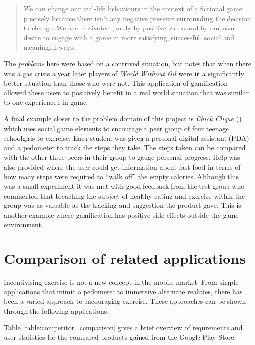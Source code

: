 \begin{quote}
  We can change our real-life
  behaviours in the context of a fictional game precisely because there
  isn't any negative pressure surrounding the decision to change. We
  are motivated purely by positive stress and by our own desire to
  engage with a game in more satisfying, successful, social and
  meaningful ways.
\end{quote}

The \emph{problems} here were based on a contrived situation, but
\citeauthor{reality_broken} notes that when there was a gas crisis a
year later players of \emph{World Without Oil} were in a significantly
better situation than those who were not. This application of
gamification allowed these users to positively benefit in a real world
situation that was similar to one experienced in game.

A final example closer to the problem domain of this project is
\emph{Chick Clique} (\citet{chick}) which uses social game elements to
encourage a peer group of four teenage schoolgirls to exercise. Each
student was given a personal digital assistant (PDA) and a pedometer
to track the steps they take. The steps taken can be compared with the
other three peers in their group to gauge personal progress. Help was
also provided where the user could get information about fast-food in
terms of how many steps were required to ``walk off'' the empty
calories. Although this was a small experiment it was met with good
feedback from the test group who commented that breaching the subject
of healthy eating and exercise within the group was as valuable as the
tracking and suggestion the product gave. This is another example
where gamification has positive side effects outside the game
environment.

\section{Comparison of related applications}\label{sec_comparison}
Incentivising exercise is not a new concept in the mobile market. From
simple applications that mimic a pedometer to immersive alternate
realities, there has been a varied approach to encouraging
exercise. These approaches can be shown through the following
applications. 

Table \ref{table:competitor_comparison} gives a brief
overview of requrements and user statistics for the compared products
gained from the Google Play Store.

